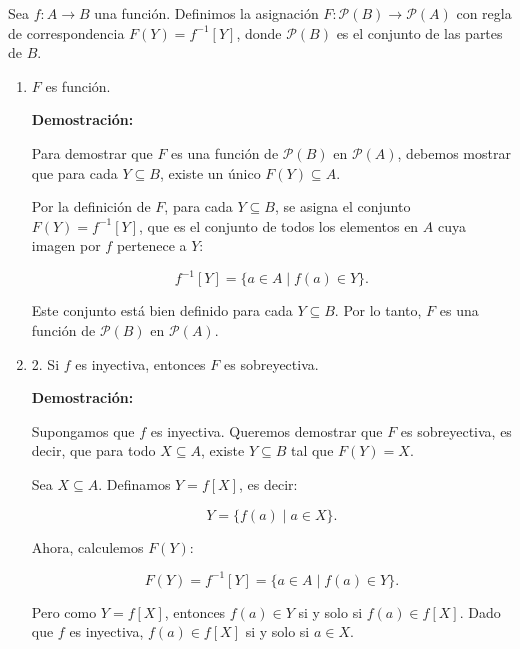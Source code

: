 \begin{solution}

    Sea \( f : A \rightarrow B \) una función. Definimos la asignación \( F : \mathcal{P}(B) \rightarrow \mathcal{P}(A) \) con regla de correspondencia \( F(Y) = f^{-1}[Y] \), donde \( \mathcal{P}(B) \) es el conjunto de las partes de \( B \).
    
    \begin{enumerate}
        \item \( F \) es función.
        
        \textbf{Demostración:}
        
        Para demostrar que \( F \) es una función de \( \mathcal{P}(B) \) en \( \mathcal{P}(A) \), debemos mostrar que para cada \( Y \subseteq B \), existe un único \( F(Y) \subseteq A \).
        
        Por la definición de \( F \), para cada \( Y \subseteq B \), se asigna el conjunto \( F(Y) = f^{-1}[Y] \), que es el conjunto de todos los elementos en \( A \) cuya imagen por \( f \) pertenece a \( Y \):
        
        \[
        f^{-1}[Y] = \{ a \in A \mid f(a) \in Y \}.
        \]
        
        Este conjunto está bien definido para cada \( Y \subseteq B \). Por lo tanto, \( F \) es una función de \( \mathcal{P}(B) \) en \( \mathcal{P}(A) \).
        
        \item 2. Si \( f \) es inyectiva, entonces \( F \) es sobreyectiva.
        
        \textbf{Demostración:}
        
        Supongamos que \( f \) es inyectiva. Queremos demostrar que \( F \) es sobreyectiva, es decir, que para todo \( X \subseteq A \), existe \( Y \subseteq B \) tal que \( F(Y) = X \).
        
        Sea \( X \subseteq A \). Definamos \( Y = f[X] \), es decir:
        
        \[
        Y = \{ f(a) \mid a \in X \}.
        \]
        
        Ahora, calculemos \( F(Y) \):
        
        \[
        F(Y) = f^{-1}[Y] = \{ a \in A \mid f(a) \in Y \}.
        \]
        
        Pero como \( Y = f[X] \), entonces \( f(a) \in Y \) si y solo si \( f(a) \in f[X] \). Dado que \( f \) es inyectiva, \( f(a) \in f[X] \) si y solo si \( a \in X \).
        

\end{enumerate}
\end{solution}

